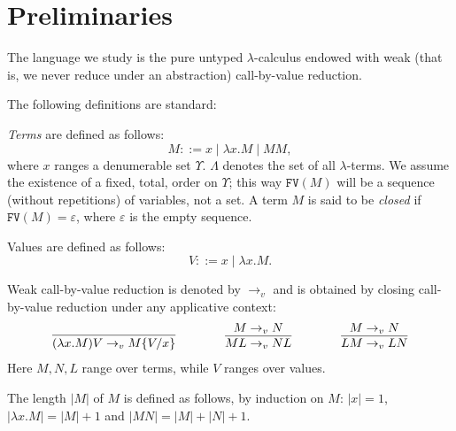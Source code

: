 \documentclass{LMCS}
\newcommand{\varone}{x}
\newcommand{\lambdaone}{M}
\newcommand{\lambdatwo}{N}
\newcommand{\lambdathree}{L}
\newcommand{\valueone}{V}
\newcommand{\Variables}{\Upsilon}
\newcommand{\Lambdaterms}{\Lambda}
\newcommand{\rewrlambdav}{\rightarrow_v}
\newcommand{\FV}[1]{\mathtt{FV}(#1)}
\newcommand{\length}[1]{|#1|}
\newenvironment{varitemize}
{
\begin{list}{\labelitemi}
{\setlength{\itemsep}{0.0mm}
 \setlength{\topsep}{0.0mm}
 \setlength{\parindent}{0.0mm}
 \setlength{\parskip}{0.0mm}
 \setlength{\parsep}{0.0mm}
 \setlength{\partopsep}{0.0mm}
 \setlength{\leftmargin}{15pt}
 \setlength{\labelsep}{5pt}
 \setlength{\labelwidth}{10pt}}}
{
 \end{list} 
}
\begin{document}
\section{Preliminaries}\label{sect:prelim}
The language we study is the pure untyped
$\lambda$-calculus endowed with weak (that is, we never reduce
under an abstraction)
call-by-value reduction. 
\begin{defi}
The following definitions are standard:
\begin{varitemize}
  \item
    \emph{Terms} are defined as follows:
    $$
    \lambdaone::=\varone\;|\;\lambda\varone.\lambdaone\;|\;\lambdaone\lambdaone ,
    $$
    where $\varone$ ranges a denumerable set $\Variables$.
    $\Lambdaterms$ denotes the set of all $\lambda$-terms.
    We assume the existence of a fixed, total, order on $\Variables$; this
    way $\FV{\lambdaone}$ will be a sequence (without repetitions) of variables, not a set. A term
    $\lambdaone$ is said to be \emph{closed} if $\FV{\lambdaone}=\varepsilon$,
    where $\varepsilon$ is the empty sequence.
  \item
    Values are defined as follows:
    $$
    \valueone::=\varone\;|\;\lambda\varone.\lambdaone .
    $$
\item
    Weak call-by-value reduction is denoted by $\rewrlambdav$
    and is obtained by closing call-by-value reduction under
    any applicative context:
    $$
    \begin{array}{ccccccccc}
      \infer{(\lambda\varone.\lambdaone)\valueone\rewrlambdav\lambdaone\{\valueone/\varone\}}{}
      &&&&
      \infer{\lambdaone\lambdathree\rewrlambdav\lambdatwo\lambdathree}{\lambdaone\rewrlambdav\lambdatwo}
      &&&&
      \infer{\lambdathree\lambdaone\rewrlambdav\lambdathree\lambdatwo}{\lambdaone\rewrlambdav\lambdatwo}
    \end{array}
    $$
    Here $\lambdaone, \lambdatwo, \lambdathree$ range over terms, while $\valueone$ ranges over values.
  \item
    The length $\length{M}$ of $M$ is defined as follows, by induction
    on $M$: $\length{\varone}=1$, $\length{\lambda\varone.\lambdaone}=\length{\lambdaone}+1$ 
    and $\length{\lambdaone\lambdatwo}=\length{\lambdaone}+\length{\lambdatwo}+1$.
\end{varitemize}
\end{defi}
\end{document}
